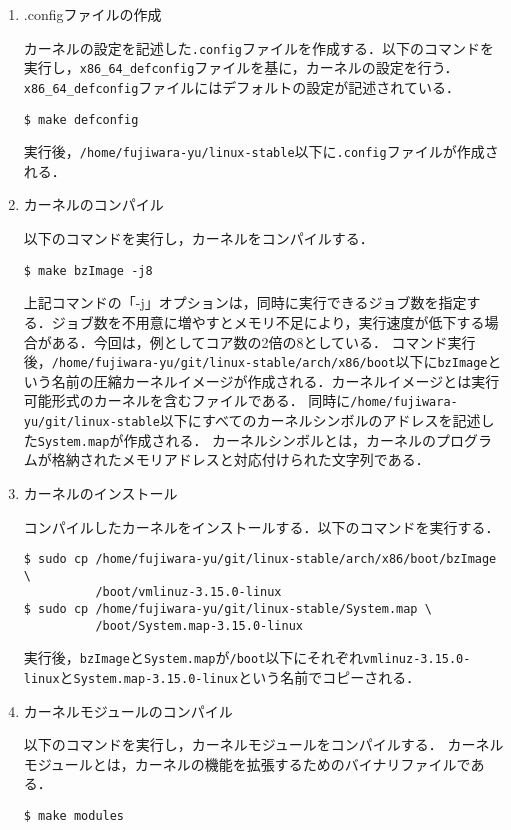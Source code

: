\documentclass[12pt]{jsarticle}
\begin{document}
\begin{enumerate}
\item .configファイルの作成

カーネルの設定を記述した\verb|.config|ファイルを作成する．以下のコマンドを実行し，\verb|x86_64_defconfig|ファイルを基に，カーネルの設定を行う．\verb|x86_64_defconfig|ファイルにはデフォルトの設定が記述されている．
\begin{verbatim}
$ make defconfig
\end{verbatim}
実行後，\verb|/home/fujiwara-yu/linux-stable|以下に\verb|.config|ファイルが作成される．

\item カーネルのコンパイル

以下のコマンドを実行し，カーネルをコンパイルする．
\begin{verbatim}
$ make bzImage -j8
\end{verbatim}
上記コマンドの「-j」オプションは，同時に実行できるジョブ数を指定する．ジョブ数を不用意に増やすとメモリ不足により，実行速度が低下する場合がある．今回は，例としてコア数の2倍の8としている．
コマンド実行後，\verb|/home/fujiwara-yu/git/linux-stable/arch/x86/boot|以下に\verb|bzImage|という名前の圧縮カーネルイメージが作成される．カーネルイメージとは実行可能形式のカーネルを含むファイルである．
同時に\verb|/home/fujiwara-yu/git/linux-stable|以下にすべてのカーネルシンボルのアドレスを記述した\verb|System.map|が作成される．
カーネルシンボルとは，カーネルのプログラムが格納されたメモリアドレスと対応付けられた文字列である．

\item カーネルのインストール

コンパイルしたカーネルをインストールする．以下のコマンドを実行する．
\begin{verbatim}
$ sudo cp /home/fujiwara-yu/git/linux-stable/arch/x86/boot/bzImage \
          /boot/vmlinuz-3.15.0-linux
$ sudo cp /home/fujiwara-yu/git/linux-stable/System.map \
          /boot/System.map-3.15.0-linux
\end{verbatim}
実行後，\verb|bzImage|と\verb|System.map|が\verb|/boot|以下にそれぞれ\verb|vmlinuz-3.15.0-linux|と\verb|System.map-3.15.0-linux|という名前でコピーされる．

\item カーネルモジュールのコンパイル

以下のコマンドを実行し，カーネルモジュールをコンパイルする．
カーネルモジュールとは，カーネルの機能を拡張するためのバイナリファイルである．
\begin{verbatim}
$ make modules
\end{verbatim}


\end{enumerate}
\end{document}
